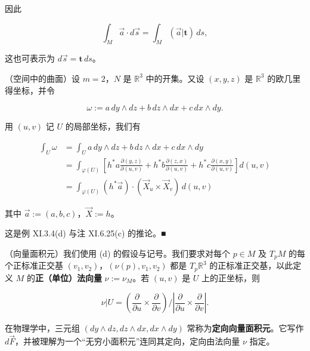 \begin{remark}
\begin{items}
因此

\[
\int_M \vec a \cdot d\vec s = \int_M (\vec a|\mathbf{t}) \, ds ,
\]

这也可表示为 $ d\vec s = \mathbf{t}\, ds $。

\item

（空间中的曲面）设 $ m = 2 $，$ N $ 是 $ \mathbb{R}^3 $ 中的开集。又设 $ (x, y, z) $ 是 $ \mathbb{R}^3 $ 的欧几里得坐标，并令

\[
\omega := a\,dy \wedge dz + b\,dz \wedge dx + c\,dx \wedge dy .
\]

用 $ (u, v) $ 记 $ U $ 的局部坐标，我们有

\begin{equation*}
\begin{aligned}
\int_U \omega &= \int_U a\,dy \wedge dz + b\,dz \wedge dx + c\,dx \wedge dy \\ &= \int_{\varphi(U)} \left[ h^* a \frac{\partial(y, z)}{\partial(u, v)} + h^* b \frac{\partial(z, x)}{\partial(u, v)} + h^* c \frac{\partial(x, y)}{\partial(u, v)} \right] d(u, v) \\ &= \int_{\varphi(U)} (h^* \vec a) \cdot (\vec X_u \times \vec X_v) \, d(u, v)
\end{aligned}
\end{equation*}

其中 $ \vec a := (a, b, c) $，$ \vec X := h $。

\proofhead
这是例 XI.3.4(d) 与注 XI.6.25(c) 的推论。\nobreak\hspace{0.35em}■
\item

（向量面积元）我们使用 (d) 的假设与记号。我们要求对每个 $ p \in M $ 及 $ T_p M $ 的每个正标准正交基 $ (v_1, v_2) $，$ (\nu(p), v_1, v_2) $ 都是 $ T_p \mathbb{R}^3 $ 的正标准正交基，以此定义 $ M $ 的\textbf{正（单位）法向量} $ \nu := \nu_M $。若 $ (u, v) $ 是 $ U $ 上的正坐标，则

\begin{equation}
\nu|U = \left( \frac{\partial}{\partial u} \times \frac{\partial}{\partial v} \right) \Big/ \left| \frac{\partial}{\partial u} \times \frac{\partial}{\partial v} \right| .\tag{2.7}
\end{equation}
\end{items}


在物理学中，三元组 $ (dy \wedge dz, dz \wedge dx, dx \wedge dy) $ 常称为\textbf{定向向量面积元}。它写作 $ d\vec F $，并被理解为一个“无穷小面积元”连同其定向，定向由法向量 $ \nu $ 指定。


\end{remark}
